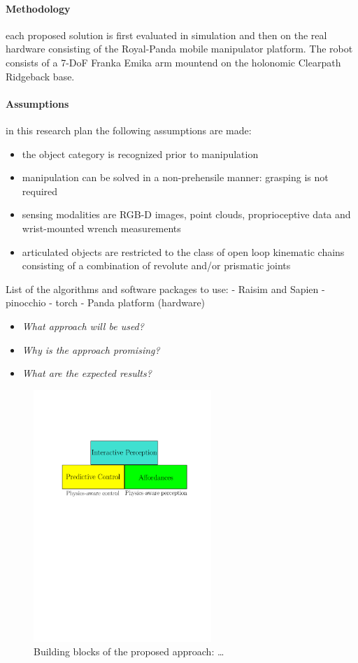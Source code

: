\paragraph{Methodology} each proposed solution is first evaluated in simulation and then on the real hardware consisting of the Royal-Panda mobile manipulator platform. The robot consists of a 7-DoF Franka Emika arm mountend on the holonomic Clearpath Ridgeback base. 

\paragraph{Assumptions} in this research plan the following assumptions are made:
\begin{itemize}
\item the object category is recognized prior to manipulation
\item manipulation can be solved in a non-prehensile manner: grasping is not required
\item sensing modalities are RGB-D images, point clouds, proprioceptive data and wrist-mounted wrench measurements 
\item articulated objects are restricted to the class of open loop kinematic chains consisting of a combination of revolute and/or prismatic joints
\end{itemize} 

List of the algorithms and software packages to use:
- Raisim and Sapien
- pinocchio
- torch
- Panda platform (hardware)

\begin{itemize}
	\item \emph{What approach will be used?}
	\item \emph{Why is the approach promising?}
	\item \emph{What are the expected results?}
\end{itemize}

\begin{figure}[h]
\centering
\includegraphics[width=0.6\textwidth]{images/blocks.pdf}
\caption{Building blocks of the proposed approach: \ldots}
\end{figure}

